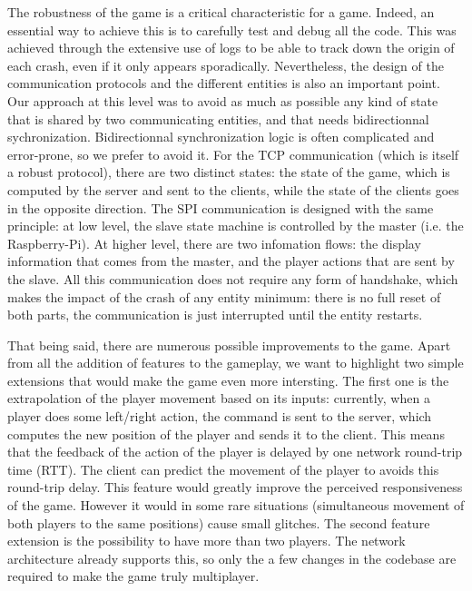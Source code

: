 \documentclass[english, DIV=13]{scrartcl}
\begin{document}
The robustness of the game is a critical characteristic for a game. Indeed, an essential way to achieve this
is to carefully test and debug all the code. This was achieved through the extensive use of logs to be able
to track down the origin of each crash, even if it only appears sporadically.
Nevertheless, the design of the communication protocols and the different entities is also an
important point. Our approach at this level was to avoid as much as possible any kind of state that is
shared by two communicating entities, and that needs bidirectionnal sychronization.
Bidirectionnal synchronization logic is often complicated and error-prone, so we prefer to avoid it.
For the TCP communication (which is itself a robust protocol), there are two distinct states:
the state of the game, which is computed by the server and sent to the clients, while the state of the clients
goes in the opposite direction.
The SPI communication is designed with the same principle: at low level, the slave state machine is controlled
by the master (i.e. the Raspberry-Pi). At higher level, there are two infomation flows: the display information
that comes from the master, and the player actions that are sent by the slave. All this communication does not
require any form of handshake, which makes the impact of the crash of any entity minimum: there is no full
reset of both parts, the communication is just interrupted until the entity restarts.

That being said, there are numerous possible improvements to the game. Apart from all the addition of features
to the gameplay, we want to highlight two simple extensions that would make the game even more intersting.
The first one is the extrapolation of the player movement based on its inputs: currently, when a player does
some left/right action, the command is sent to the server, which computes the new position of the player and
sends it to the client. This means that the feedback of the action of the player is delayed by one network
round-trip time (RTT). The client can predict the movement of the player to avoids this round-trip delay.
This feature would greatly improve the perceived responsiveness of the game. However it would in some rare
situations (simultaneous movement of both players to the same positions) cause small glitches.
The second feature extension is the possibility to have more than two players. The network architecture
already supports this, so only the a few changes in the codebase are required to make the game truly
multiplayer.
\end{document}
